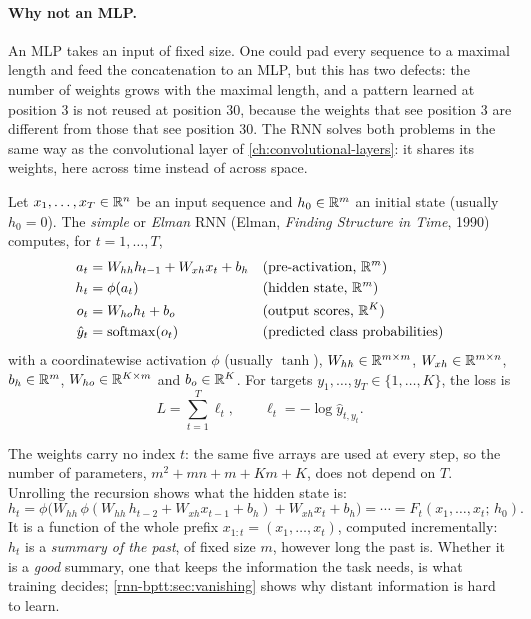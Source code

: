 \begin{notechapter}
\paragraph{Why not an MLP.} An MLP takes an input of fixed size. One could pad every
sequence to a maximal length and feed the concatenation to an MLP, but this has two
defects: the number of weights grows with the maximal length, and a pattern learned at
position $3$ is not reused at position $30$, because the weights that see position $3$ are
different from those that see position $30$. The RNN solves both problems in the same way
as the convolutional layer of \cref{ch:convolutional-layers}: it shares its weights, here
across time instead of across space.

\begin{definition}\label{rnn-bptt:def:rnn}
Let $x_1,\dots,x_T\in\mathbb{R}^{n}$ be an input sequence and $h_0\in\mathbb{R}^m$ an initial state (usually
$h_0 = 0$). The \emph{simple} or \emph{Elman} RNN (Elman, \emph{Finding Structure in Time}, 1990) computes, for
$t = 1,\dots,T$,
\begin{align*}
  a_t &= W_{hh}h_{t-1} + W_{xh}x_t + b_h &&\text{(pre-activation, }\mathbb{R}^m\text{)}\\
  h_t &= \phi(a_t) &&\text{(hidden state, }\mathbb{R}^m\text{)}\\
  o_t &= W_{ho}h_t + b_o &&\text{(output scores, }\mathbb{R}^K\text{)}\\
  \hat y_t &= \operatorname{softmax}(o_t) &&\text{(predicted class probabilities)}
\end{align*}
with a coordinatewise activation $\phi$ (usually $\tanh$), $W_{hh}\in\mathbb{R}^{m\times m}$,
$W_{xh}\in\mathbb{R}^{m\times n}$, $b_h\in\mathbb{R}^m$, $W_{ho}\in\mathbb{R}^{K\times m}$ and $b_o\in\mathbb{R}^K$. For targets
$y_1,\dots,y_T\in\{1,\dots,K\}$, the loss is
\[
  L = \sum_{t=1}^T\ell_t,\qquad \ell_t = -\log\hat y_{t,y_t}.
\]
\end{definition}

The weights carry no index $t$: the same five arrays are used at every step, so the number
of parameters, $m^2 + mn + m + Km + K$, does not depend on $T$. Unrolling the recursion
shows what the hidden state is:
\[
  h_t = \phi\bigl(W_{hh}\,\phi(W_{hh}\,h_{t-2} + W_{xh}x_{t-1} + b_h) + W_{xh}x_t + b_h\bigr)
  = \cdots = F_t(x_1,\dots,x_t;\,h_0) .
\]
It is a function of the whole prefix $x_{1:t} = (x_1,\dots,x_t)$, computed incrementally: $h_t$ is a
\emph{summary of the past}, of fixed size $m$, however long the past is. Whether it is a
\emph{good} summary, one that keeps the information the task needs, is what training
decides; \cref{rnn-bptt:sec:vanishing} shows why distant information is hard to learn.


\end{notechapter}
